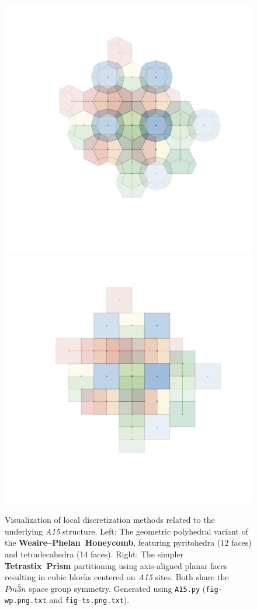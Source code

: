 \documentclass[10pt]{article}
\def\AAAB{\textit{A15}}
\def\WP{Weaire--Phelan}
\def\WPH{\WP{}~Honeycomb}
\def\TSP{Tetrastix~Prism}
\begin{document}
\begin{figure}[!ht]
    \capstart
    \centering
    \includegraphics[trim={130 140 80 50}, scale=0.35]{fig-wp}%
    \includegraphics[trim={130 140 80 50}, scale=0.35]{fig-ts}
    \caption{Visualization of local discretization methods related to the underlying \AAAB{} structure. Left: The geometric polyhedral variant of the \textbf{\WPH{}}, featuring pyritohedra (12 faces) and tetradecahedra (14 faces). Right: The simpler \textbf{\TSP{}} partitioning using axis-aligned planar faces resulting in cubic blocks centered on \AAAB{} sites. Both share the $Pm\bar{3}n$ space group symmetry. Generated using \texttt{A15.py} (\texttt{fig-wp.png.txt} and \texttt{fig-ts.png.txt}).}
    \label{fig-wp-ts}
\end{figure}
\end{document}

